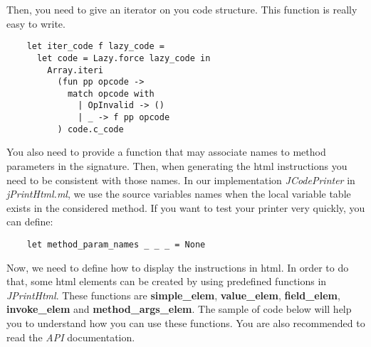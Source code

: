 \documentclass{article}
\begin{document}
Then, you need to give an iterator on you code structure. This
function is really easy to write.

\begin{verbatim}
    let iter_code f lazy_code =
      let code = Lazy.force lazy_code in
        Array.iteri
          (fun pp opcode ->
            match opcode with
              | OpInvalid -> ()
              | _ -> f pp opcode
          ) code.c_code
\end{verbatim}
You also need to provide a function that may associate names to
method parameters in the signature. Then, when generating the html
instructions you need to be consistent with those names. In our
implementation \emph{JCodePrinter} in \emph{jPrintHtml.ml}, we use
the source variables names when the local variable table exists in
the considered method. If you want to test your printer very
quickly, you can define:

\begin{verbatim}
    let method_param_names _ _ _ = None
\end{verbatim}
Now, we need to define how to display the instructions in html. In
order to do that, some html elements can be created by using
predefined functions in \emph{JPrintHtml}. These functions are
\textbf{simple\_elem}, \textbf{value\_elem}, \textbf{field\_elem},
\textbf{invoke\_elem} and \textbf{method\_args\_elem}. The sample
of code below will help you to understand how you can use these
functions. You are also recommended to read the \emph{API}
documentation.
\end{document}
